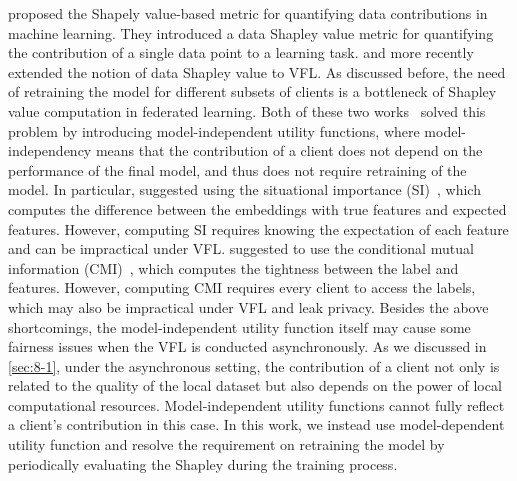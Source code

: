 \citet{ghorbani2019data} proposed the Shapely value-based metric for quantifying data contributions in machine learning. They introduced a data Shapley value metric for quantifying the contribution of a single data point to a learning task. \citet{wang2019measure} and more recently \citet{han2021data} extended the notion of data Shapley value to VFL. As discussed before, the need of retraining the model for different subsets of clients is a bottleneck of Shapley value computation in federated learning. Both of these two works~\citep{wang2019measure,han2021data} solved this problem by introducing model-independent utility functions, where model-independency means that the contribution of a client does not depend on the performance of the final model, and thus does not require retraining of the model. In particular, \citet{wang2019measure} suggested using the situational importance (SI)~\citep{achen1982interpreting}, which computes the difference between the embeddings with true features and expected features. However, computing SI requires knowing the expectation of each feature and can be impractical under VFL. \citet{han2021data} suggested to use the conditional mutual information (CMI)~\citep{brown2012conditional}, which computes the tightness between the label and features. However, computing CMI requires every client to access the labels, which may also be impractical under VFL and leak privacy. Besides the above shortcomings, the model-independent utility function itself may cause some fairness issues when the VFL is conducted asynchronously. As we discussed in \autoref{sec:8-1}, under the asynchronous setting, the contribution of a client not only is related to the quality of the local dataset but also depends on the power of local computational resources. Model-independent utility functions cannot fully reflect a client's contribution in this case. In this work, we instead use model-dependent utility function and resolve the requirement on retraining the model by periodically evaluating the Shapley during the training process.


